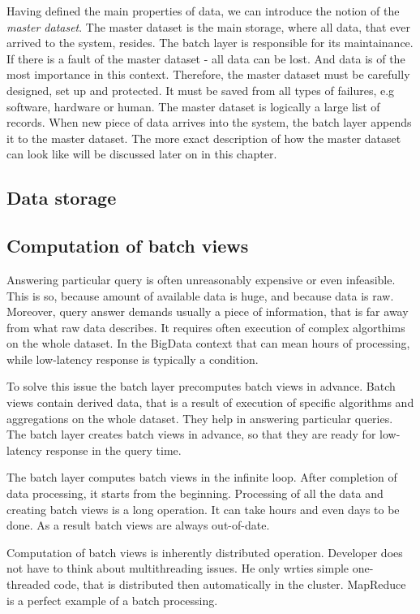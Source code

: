 Having defined the main properties of data, we can introduce the notion of the \textit{master dataset}.
The master dataset is the main storage, where all data, that ever arrived to the system, resides.
The batch layer is responsible for its maintainance.
If there is a fault of the master dataset - all data can be lost.
And data is of the most importance in this context.
Therefore, the master dataset must be carefully designed, set up and protected.
It must be saved from all types of failures, e.g software, hardware or human.
The master dataset is logically a large list of records.
When new piece of data arrives into the system, the batch layer appends it to the master dataset.
The more exact description of how the master dataset can look like will be discussed later on in this chapter.



\subsection{Data storage}


\subsection{Computation of batch views}


Answering particular query is often unreasonably expensive or even infeasible.
This is so, because amount of available data is huge, and because data is raw. 
Moreover, query answer demands usually a piece of information, that is far away from what raw data describes.
It requires often execution of complex algorthims on the whole dataset.
In the BigData context that can mean hours of processing, while low-latency response is typically a condition.

To solve this issue the batch layer precomputes batch views in advance.
Batch views contain derived data, that is a result of execution of specific algorithms and aggregations on the whole dataset.
They help in answering particular queries.
The batch layer creates batch views in advance, so that they are ready for low-latency response in the query time.

The batch layer computes batch views in the infinite loop.
After completion of data processing, it starts from the beginning.
Processing of all the data and creating batch views is a long operation.
It can take hours and even days to be done.
As a result batch views are always out-of-date.

Computation of batch views is inherently distributed operation.
Developer does not have to think about multithreading issues.
He only wrties simple one-threaded code, that is distributed then automatically in the cluster.
MapReduce is a perfect example of a batch processing.